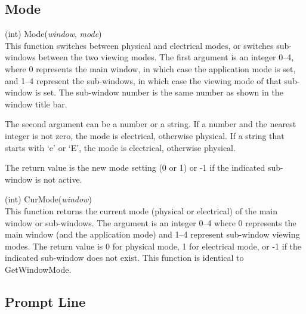 \subsection{Mode}

\begin{description}
\item{(int) \vt Mode({\it window}, {\it mode\/})}\\
This function switches {\Xic} between physical and electrical modes,
or switches sub-windows between the two viewing modes.  The first
argument is an integer 0--4, where 0 represents the main window, in
which case the application mode is set, and 1--4 represent the
sub-windows, in which case the viewing mode of that sub-window is set. 
The sub-window number is the same number as shown in the window title
bar.

The second argument can be a number or a string.  If a number and the
nearest integer is not zero, the mode is electrical, otherwise
physical.  If a string that starts with `{\vt e}' or `{\vt E}', the
mode is electrical, otherwise physical.

The return value is the new mode setting (0 or 1) or
-1 if the indicated sub-window is not active.

\item{(int) \vt CurMode({\it window\/})}\\
This function returns the current mode (physical or electrical) of the
main window or sub-windows.  The argument is an integer 0--4 where 0
represents the main window (and the application mode) and 1--4
represent sub-window viewing modes.  The return value is 0 for physical
mode, 1 for electrical mode, or -1 if the indicated sub-window does not
exist.  This function is identical to {\vt GetWindowMode}.

\end{description}


\subsection{Prompt Line}

